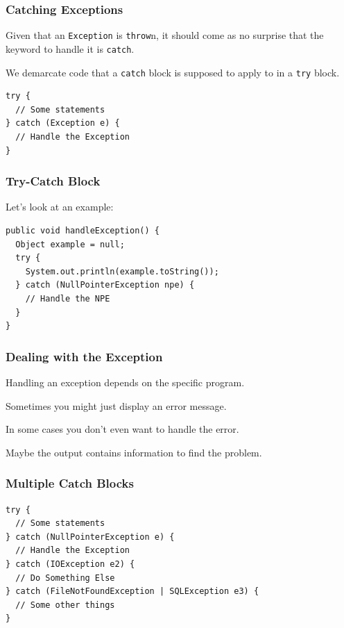 \begin{frame}[fragile]
\frametitle{Catching Exceptions}
\begin{changemargin}{1cm}

Given that an \texttt{Exception} is \texttt{throw}n, it should come as no surprise that the keyword to handle it is \texttt{catch}. 

We demarcate code that a \texttt{catch} block is supposed to apply to in a \texttt{try} block. 

\begin{verbatim}
try {
  // Some statements   
} catch (Exception e) {
  // Handle the Exception
}
\end{verbatim}

\end{changemargin}
\end{frame}


\begin{frame}[fragile]
\frametitle{Try-Catch Block}
\begin{changemargin}{1cm}

Let's look at an example:

\begin{verbatim}
public void handleException() {
  Object example = null;
  try {
    System.out.println(example.toString());
  } catch (NullPointerException npe) {
    // Handle the NPE
  }
}
\end{verbatim}

\end{changemargin}
\end{frame}

\begin{frame}
\frametitle{Dealing with the Exception}
\begin{changemargin}{1cm}

Handling an exception depends on the specific program. 

Sometimes you might just display an error message.

In some cases you don't even want to handle the error.

Maybe the output contains information to find the problem. 

\end{changemargin}
\end{frame}

\begin{frame}[fragile]
\frametitle{Multiple Catch Blocks}
\begin{changemargin}{1cm}

\begin{verbatim}
try {
  // Some statements   
} catch (NullPointerException e) {
  // Handle the Exception
} catch (IOException e2) {
  // Do Something Else
} catch (FileNotFoundException | SQLException e3) {
  // Some other things
}
\end{verbatim}

\end{changemargin}
\end{frame}

